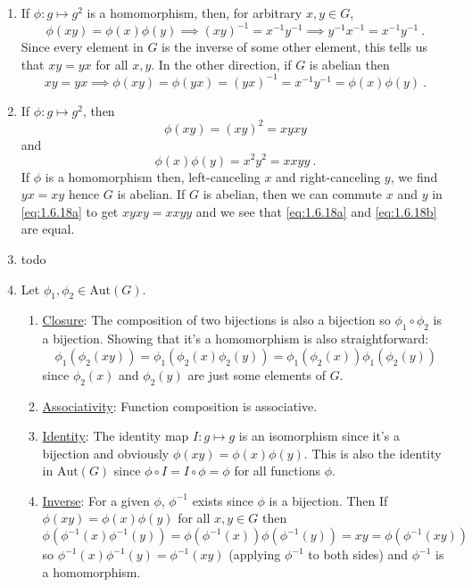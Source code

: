 \documentclass[]{article}
\begin{document}
\begin{enumerate}
\item If $\phi: g \mapsto g^2$ is a homomorphism, then, for arbitrary $x,y \in G$,
\begin{equation}
\phi(xy) = \phi(x)\phi(y) \implies (xy)^{-1} = x^{-1}y^{-1} \implies y^{-1}x^{-1} = x^{-1}y^{-1}\ .
\end{equation}
Since every element in $G$ is the inverse of some other element, this tells us that $xy = yx$ for all $x,y$. In the other direction, if $G$ is abelian then
\begin{equation}
xy = yx \implies \phi(xy) = \phi(yx) = (yx)^{-1} = x^{-1}y^{-1} = \phi(x)\phi(y)\ .
\end{equation}


\item If $\phi: g \mapsto g^2$, then
\begin{equation}
\phi(xy) = (xy)^2 = xyxy \label{eq:1.6.18a}
\end{equation}
and
\begin{equation}
\phi(x)\phi(y) = x^2y^2 = xxyy\ . \label{eq:1.6.18b}
\end{equation}
If $\phi$ is a homomorphism then, left-canceling $x$ and right-canceling $y$, we find $yx = xy$ hence $G$ is abelian. If $G$ is abelian, then we can commute $x$ and $y$ in \eqref{eq:1.6.18a} to get $xyxy = xxyy$ and we see that \eqref{eq:1.6.18a} and \eqref{eq:1.6.18b} are equal.


\item {\color{red} todo}


\item Let $\phi_1, \phi_2 \in \text{Aut}(G)$.
\begin{enumerate}
\item \underline{Closure}: The composition of two bijections is also a bijection so $\phi_1 \circ \phi_2$ is a bijection. Showing that it's a homomorphism is also straightforward:
\begin{equation}
\phi_1(\phi_2(xy)) = \phi_1(\phi_2(x)\phi_2(y)) = \phi_1(\phi_2(x))\phi_1(\phi_2(y))
\end{equation}
since $\phi_2(x)$ and $\phi_2(y)$ are just some elements of $G$.
\item \underline{Associativity}: Function composition is associative.
\item \underline{Identity}: The identity map $I: g \mapsto g$ is an isomorphism since it's a bijection and obviously $\phi(xy) = \phi(x)\phi(y)$. This is also the identity in $\text{Aut}(G)$ since $\phi \circ I = I \circ \phi = \phi$ for all functions $\phi$.
\item \underline{Inverse}: For a given $\phi$, $\phi^{-1}$ exists since $\phi$ is a bijection. Then If $\phi(xy) = \phi(x)\phi(y)$ for all $x,y \in G$ then 
\begin{equation}
\phi(\phi^{-1}(x)\phi^{-1}(y)) = \phi(\phi^{-1}(x))\phi(\phi^{-1}(y)) = xy = \phi(\phi^{-1}(xy))
\end{equation}
so $\phi^{-1}(x)\phi^{-1}(y) = \phi^{-1}(xy)$ (applying $\phi^{-1}$ to both sides) and $\phi^{-1}$ is a homomorphism.
\end{enumerate}



\end{enumerate}
\end{document}

